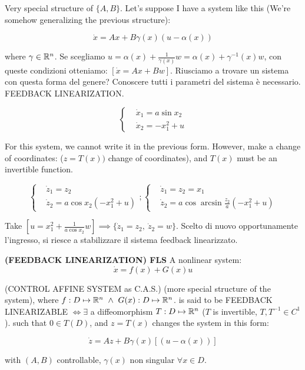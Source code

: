 Very special structure of $\{A,B\}$. Let's suppose I have a system like this (We're somehow generalizing the previous structure):

\[
	\dot{x} = Ax + B\gamma(x)(u-\alpha(x))
\]

where $\gamma \in \mathbb{R}^n$. 
Se scegliamo $u = \alpha(x) + \frac{1}{\gamma(x)}w = \alpha(x)+\gamma^{-1}(x)w$, con queste condizioni otteniamo: $[\dot{x} = Ax + Bw]$. Riusciamo a trovare un sistema con questa forma del genere? Conoscere tutti i parametri del sistema è necessario. FEEDBACK LINEARIZATION.

\[
	\left\{
	\begin{aligned}
	&\dot{x}_1 = a\sin{x_2} \\
	&\dot{x}_2 = -x_1^2 + u
	\end{aligned}
	\right.
\]

For this system, we cannot write it in the previous form. However, make a change of coordinates: ($z=T(x))$ change of coordinates), and $T(x)$ must be an invertible function. 

\[
	\left\{
	\begin{aligned}
	&\dot{z}_1 = z_2 \\
	&\dot{z}_2 = a\cos{x_2}(-x_1^2 + u)
	\end{aligned}
	\right. ; \left\{
	\begin{aligned}
	&\dot{z}_1 = z_2 = x_1 \\
	&\dot{z}_2 = a\cos{\arcsin{\frac{z_2}{a}(-x_1^2 + u)}}
	\end{aligned}
	\right.
\]

Take $[u = x_1^2 + \frac{1}{a\cos{x_2}}w] \implies \{\dot{z}_1 = z_2,\ \dot{z}_2 = w\}$. Scelto di nuovo opportunamente l'ingresso, si riesce a stabilizzare il sistema feedback linearizzato.

\begin{defn}{\textbf{(FEEDBACK LINEARIZATION) FLS}} \newline
A nonlinear system:
\[
	\dot{x} = f(x) + G(x)u
\]

(CONTROL AFFINE SYSTEM as C.A.S.) (more special structure of the system), where $f:D \mapsto \R^n\ \land\ G(x):D \mapsto \R^n$. is said to be FEEDBACK LINEARIZABLE $\iff \exists$ a diffeomorphism $T:D \mapsto \mathbb{R}^n$ ($T$ is invertible, $T,T^{-1} \in C^1$). such that $0 \in T(D)$, and $z=T(x)$ changes the system in this form:

\[
	\dot{z}=Az + B\gamma(x)[(u-\alpha(x))]
\]

with $(A,B)$ controllable, $\gamma(x)$ non singular $\forall x \in D$.
\end{defn}

